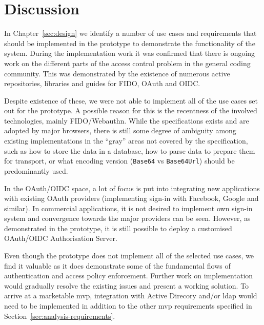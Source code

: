 \section{Discussion}\label{sec:discussion}


In Chapter~\ref{sec:design} we identify a number of use cases and requirements that should be implemented in the prototype to demonstrate the functionality of the system. During the implementation work it was confirmed that there is ongoing work on the different parts of the access control problem in the general coding community. This was demonstrated by the existence of numerous active repositories, libraries and guides for FIDO, OAuth and OIDC.

Despite existence of these, we were not able to implement all of the use cases set out for the prototype. A possible reason for this is the recentness of the involved technologies, mainly FIDO/Webauthn. While the specifications exists and are adopted by major browsers, there is still some degree of ambiguity among existing implementations in the ``gray'' areas not covered by the specification, such as how to store the data in a database, how to parse data to prepare them for transport, or what encoding version (\texttt{Base64} vs \texttt{Base64Url}) should be predominantly used.

In the OAuth/OIDC space, a lot of focus is put into integrating new applications with existing OAuth providers (implementing sign-in with Facebook, Google and similar). In commercial applications, it is not desired to implement own sign-in system and convergence towards the major providers can be seen. However, as demonstrated in the prototype, it is still possible to deploy a customised OAuth/OIDC Authorisation Server.

Even though the prototype does not implement all of the selected use cases, we find it valuable as it does demonstrate some of the fundamental flows of authentication and access policy enforcement. Further work on implementation would gradually resolve the existing issues and present a working solution. To arrive at a marketable \acrshort{mvp}, integration with Active Direcory and/or \acrshort{ldap} would need to be implemented in addition to the other \acrshort{mvp} requirements specified in Section~\ref{sec:analysis-requirements}.








